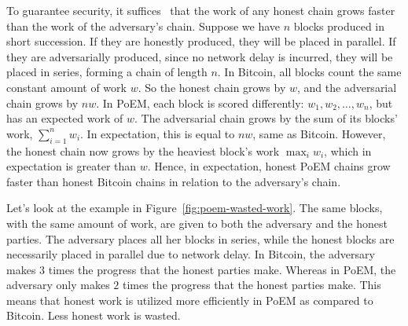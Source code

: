 To guarantee security, it suffices~\cite{eiar} that the work of any honest chain grows
faster than the work of the adversary's chain.
Suppose we have $n$ blocks produced in short succession.
If they are honestly produced, they will be placed in parallel.
If they are adversarially produced, since no network delay is incurred, they will be placed in series,
forming a chain of length $n$.
In Bitcoin, all blocks count the same constant amount of work $w$. So the honest chain grows by $w$,
and the adversarial chain grows by $n w$.
In PoEM, each block is scored differently: $w_1, w_2, \dots, w_n$, but has an expected work of $w$.
The adversarial chain grows by the sum of its blocks' work, $\sum_{i=1}^n w_i$.
In expectation, this is equal to $n w$, same as Bitcoin.
However, the honest chain now grows by the heaviest block's work $\max_i w_i$,
which in expectation is greater than $w$. Hence, in expectation, honest PoEM chains grow
faster than honest Bitcoin chains in relation to the adversary's chain.

Let's look at the example in Figure~\ref{fig:poem-wasted-work}.
The same blocks, with the same amount of work, are given to both the adversary and the honest parties.
The adversary places all her blocks in series, while the honest blocks are necessarily placed in parallel
due to network delay.
In Bitcoin, the adversary makes $3$ times the progress that the honest parties make.
Whereas in PoEM, the adversary only makes $2$ times the progress that the honest parties make.
This means that honest work is utilized more efficiently in PoEM as compared to Bitcoin.
Less honest work is wasted.

